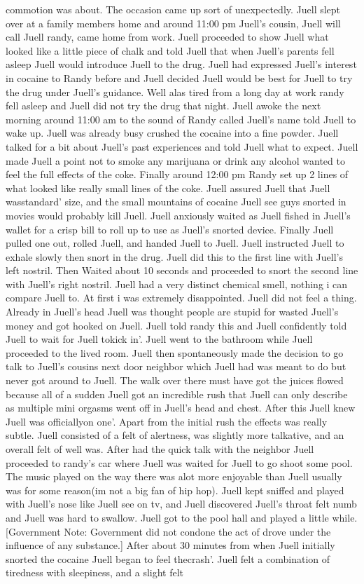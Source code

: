 \documentclass[12pt]{book}
\begin{document}
commotion was about. The occasion came up sort of unexpectedly. Juell slept over at a family members home and around 11:00 pm Juell's cousin, Juell will call Juell randy, came home from work. Juell proceeded to show Juell what looked like a little piece of chalk and told Juell that when Juell's parents fell asleep Juell would introduce Juell to the drug. Juell had expressed Juell's interest in cocaine to Randy before and Juell decided Juell would be best for Juell to try the drug under Juell's guidance. Well alas tired from a long day at work randy fell asleep and Juell did not try the drug that night. Juell awoke the next morning around 11:00 am to the sound of Randy called Juell's name told Juell to wake up. Juell was already busy crushed the cocaine into a fine powder. Juell talked for a bit about Juell's past experiences and told Juell what to expect. Juell made Juell a point not to smoke any marijuana or drink any alcohol wanted to feel the full effects of the coke. Finally around 12:00 pm Randy set up 2 lines of what looked like really small lines of the coke. Juell assured Juell that Juell wasstandard' size, and the small mountains of cocaine Juell see guys snorted in movies would probably kill Juell. Juell anxiously waited as Juell fished in Juell's wallet for a crisp bill to roll up to use as Juell's snorted device. Finally Juell pulled one out, rolled Juell, and handed Juell to Juell. Juell instructed Juell to exhale slowly then snort in the drug. Juell did this to the first line with Juell's left nostril. Then Waited about 10 seconds and proceeded to snort the second line with Juell's right nostril. Juell had a very distinct chemical smell, nothing i can compare Juell to. At first i was extremely disappointed. Juell did not feel a thing. Already in Juell's head Juell was thought people are stupid for wasted Juell's money and got hooked on Juell. Juell told randy this and Juell confidently told Juell to wait for Juell tokick in'. Juell went to the bathroom while Juell proceeded to the lived room. Juell then spontaneously made the decision to go talk to Juell's cousins next door neighbor which Juell had was meant to do but never got around to Juell. The walk over there must have got the juices flowed because all of a sudden Juell got an incredible rush that Juell can only describe as multiple mini orgasms went off in Juell's head and chest. After this Juell knew Juell was officiallyon one'. Apart from the initial rush the effects was really subtle. Juell consisted of a felt of alertness, was slightly more talkative, and an overall felt of well was. After had the quick talk with the neighbor Juell proceeded to randy's car where Juell was waited for Juell to go shoot some pool. The music played on the way there was alot more enjoyable than Juell usually was for some reason(im not a big fan of hip hop). Juell kept sniffed and played with Juell's nose like Juell see on tv, and Juell discovered Juell's throat felt numb and Juell was hard to swallow. Juell got to the pool hall and played a little while. [Government Note: Government did not condone the act of drove under the influence of any substance.] After about 30 minutes from when Juell initially snorted the cocaine Juell began to feel thecrash'. Juell felt a combination of tiredness with sleepiness, and a slight felt 
\end{document}

